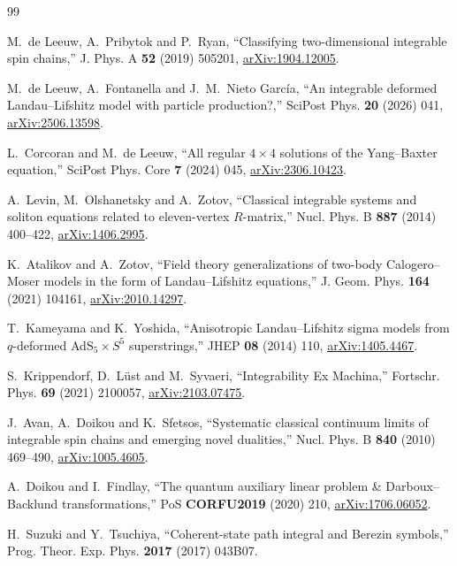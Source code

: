\clearpage
\begin{thebibliography}{99}

M.~de Leeuw, A.~Pribytok and P.~Ryan,
``Classifying two-dimensional integrable spin chains,''
J. Phys. A \textbf{52} (2019) 505201,
\href{https://arxiv.org/abs/1904.12005}{arXiv:1904.12005}.

M.~de Leeuw, A.~Fontanella and J.~M.~Nieto Garc\'ia,
``An integrable deformed Landau--Lifshitz model with particle production?,''
SciPost Phys. \textbf{20} (2026) 041,
\href{https://arxiv.org/abs/2506.13598}{arXiv:2506.13598}.

L.~Corcoran and M.~de Leeuw,
``All regular $4\times4$ solutions of the Yang--Baxter equation,''
SciPost Phys. Core \textbf{7} (2024) 045,
\href{https://arxiv.org/abs/2306.10423}{arXiv:2306.10423}.

A.~Levin, M.~Olshanetsky and A.~Zotov,
``Classical integrable systems and soliton equations related to eleven-vertex $R$-matrix,''
Nucl. Phys. B \textbf{887} (2014) 400--422,
\href{https://arxiv.org/abs/1406.2995}{arXiv:1406.2995}.

K.~Atalikov and A.~Zotov,
``Field theory generalizations of two-body Calogero--Moser models in the form of Landau--Lifshitz equations,''
J. Geom. Phys. \textbf{164} (2021) 104161,
\href{https://arxiv.org/abs/2010.14297}{arXiv:2010.14297}.

T.~Kameyama and K.~Yoshida,
``Anisotropic Landau--Lifshitz sigma models from $q$-deformed AdS$_5\times S^5$ superstrings,''
JHEP \textbf{08} (2014) 110,
\href{https://arxiv.org/abs/1405.4467}{arXiv:1405.4467}.

S.~Krippendorf, D.~L\"ust and M.~Syvaeri,
``Integrability Ex Machina,''
Fortschr. Phys. \textbf{69} (2021) 2100057,
\href{https://arxiv.org/abs/2103.07475}{arXiv:2103.07475}.

J.~Avan, A.~Doikou and K.~Sfetsos,
``Systematic classical continuum limits of integrable spin chains and emerging novel dualities,''
Nucl. Phys. B \textbf{840} (2010) 469--490,
\href{https://arxiv.org/abs/1005.4605}{arXiv:1005.4605}.

A.~Doikou and I.~Findlay,
``The quantum auxiliary linear problem \& Darboux--Backlund transformations,''
PoS \textbf{CORFU2019} (2020) 210,
\href{https://arxiv.org/abs/1706.06052}{arXiv:1706.06052}.

H.~Suzuki and Y.~Tsuchiya,
``Coherent-state path integral and Berezin symbols,''
Prog. Theor. Exp. Phys. \textbf{2017} (2017) 043B07.


\end{thebibliography}

